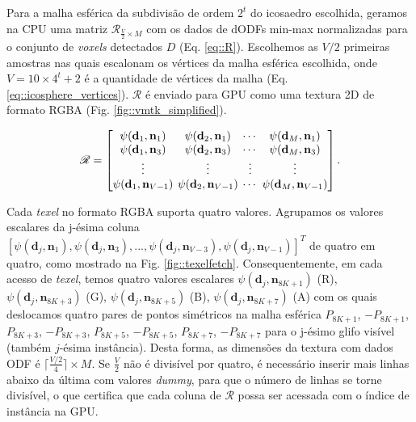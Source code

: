 Para a malha esférica da subdivisão de ordem $2^t$ do icosaedro escolhida, geramos na CPU uma matriz $\boldsymbol{\mathscr{R}}_{\frac{V}{2} \times M}$ com os dados de dODFs min-max normalizadas para o conjunto de \textit{voxels} detectados $D$ (Eq. \ref{eq::R}). Escolhemos as $V/2$ primeiras amostras nas quais escalonam os vértices da malha esférica escolhida, onde $V = 10 \times 4^t + 2$ é a quantidade de vértices da malha (Eq. \ref{eq::icosphere_vertices}). $\boldsymbol{\mathscr{R}}$ é enviado para GPU como uma textura 2D de formato RGBA (Fig. \ref{fig::vmtk_simplified}).


\begin{equation}
\label{eq::R}
\boldsymbol{\mathscr{R}} = 
\begingroup %
\setlength\arraycolsep{2pt}
\begin{bmatrix} 
    \psi(\mathbf{d}_{1}, \mathbf{n}_1) &
    \psi(\mathbf{d}_{2}, \mathbf{n}_1) & \cdots & 
    \psi(\mathbf{d}_{M}, \mathbf{n}_1)  \\
    
    \psi(\mathbf{d}_{1}, \mathbf{n}_3) &
    \psi(\mathbf{d}_{2}, \mathbf{n}_3) & \cdots & 
    \psi(\mathbf{d}_{M}, \mathbf{n}_{3}) \\ \vdots & \vdots & \vdots & \vdots  \\
    
    \psi(\mathbf{d}_{1}, \mathbf{n}_{V-1}) & 
    \psi(\mathbf{d}_{2}, \mathbf{n}_{V-1}) & \cdots & 
    \psi(\mathbf{d}_{M}, \mathbf{n}_{V-1})
\end{bmatrix}.
\endgroup
\end{equation}

Cada \textit{texel} no formato RGBA suporta quatro valores. Agrupamos os valores escalares da j-ésima coluna $[
\psi(\mathbf{d}_{j}, \mathbf{n}_1),
\psi(\mathbf{d}_{j}, \mathbf{n}_3), ...,
\psi(\mathbf{d}_{j}, \mathbf{n}_{V-3}),
\psi(\mathbf{d}_{j}, \mathbf{n}_{V-1})
]^T$ de quatro em quatro, como mostrado na Fig. \ref{fig::texelfetch}. Consequentemente, em cada acesso de \textit{texel}, temos quatro valores escalares $
\psi(\mathbf{d}_{j}, \mathbf{\mathbf{n}}_{8K+1})$ (R), $
\psi(\mathbf{d}_{j}, \mathbf{\mathbf{n}}_{8K+3})$ (G), $
\psi(\mathbf{d}_{j}, \mathbf{\mathbf{n}}_{8K+5})$ (B), $
\psi(\mathbf{d}_{j}, \mathbf{\mathbf{n}}_{8K+7})$ (A) com os quais deslocamos quatro pares de pontos simétricos na malha esférica $P_{8K+1}$, $-P_{8K+1}$, $P_{8K+3}$, $-P_{8K+3}$, $P_{8K+5}$, $-P_{8K+5}$, $P_{8K+7}$, $-P_{8K+7}$ para o j-ésimo glifo visível (também $j$-ésima instância). Desta forma, as dimensões da textura com dados ODF é $ \lceil \frac{V/2}{4} \rceil \times M$. Se $\frac{V}{2}$ não é divisível por quatro, é necessário inserir mais linhas abaixo da última com valores \textit{dummy}, para que o número de linhas se torne divisível, o que certifica que cada coluna de $\boldsymbol{\mathscr{R}}$ possa ser acessada com o índice de instância na GPU.

